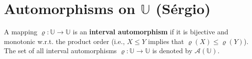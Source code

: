 \documentclass[12pt]{article}
\theoremstyle{plain}
\newtheorem{theorem}{Theorem}[section]
\theoremstyle{remark}
\theoremstyle{definition}
\theoremstyle{proposition}
\newtheorem{proposition}[theorem]{Proposition}
\newcommand{\II}{\mathbb{I} }
\newcommand{\UU}{\mathbb{U} }
\begin{document}







\section{Automorphisms on $\UU$ (Sérgio)}


A mapping $\varrho:\UU\rightarrow \UU$ is an \textbf{interval
automorphism} if it is bijective  and monotonic  w.r.t. the
product order \cite{GWW96b,GWW98} (i.e., $X\leq Y$ implies that
$\varrho(X)\leq \varrho(Y)$). The set of all interval
automorphisms $\varrho:\UU\rightarrow \UU$ is denoted by
$\mathcal{A}(\UU)$.
\end{document}

